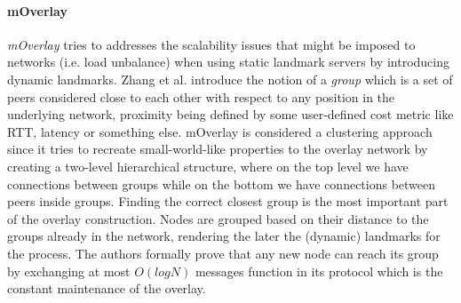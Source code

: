 \paragraph*{\bf mOverlay}
\emph{mOverlay} \cite{zhang_moverlay_2004} tries to addresses the scalability
issues that might be imposed to networks (i.e. load unbalance) when using static
landmark servers by introducing dynamic landmarks. Zhang et al. introduce the
notion of a \emph{group} which is a set of peers considered close to each other
with respect to any position in the underlying network, proximity being defined
by some user-defined cost metric like RTT, latency or something else. mOverlay
is considered a clustering approach since it tries to recreate small-world-like
properties to the overlay network by creating a two-level hierarchical
structure, where on the top level we have connections between groups while on
the bottom we have connections between peers inside groups. Finding the correct
closest group is the most important part of the overlay construction. Nodes are
grouped based on their distance to the groups already in the network, rendering
the later the (dynamic) landmarks for the process. The authors formally prove
that any new node can reach its group by exchanging at most $O(logN)$ messages
function
in its protocol which is the constant maintenance of the overlay.

